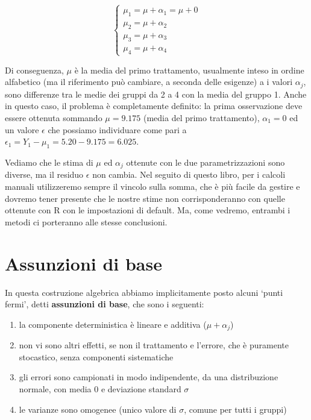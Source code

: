 \documentclass[a4paper,12pt,oneside]{book}
\providecommand{\tightlist}{%
  \setlength{\itemsep}{0pt}\setlength{\parskip}{0pt}}
\begin{document}
\[ \left\{ {\begin{array}{l}
\mu_1 = \mu + \alpha_1 = \mu + 0\\
\mu_2 = \mu + \alpha_2 \\
\mu_3 = \mu + \alpha_3 \\
\mu_4 = \mu + \alpha_4
\end{array}} \right.\]

Di conseguenza, \(\mu\) è la media del primo trattamento, usualmente inteso in ordine alfabetico (ma il riferimento può cambiare, a seconda delle esigenze) a i valori \(\alpha_j\), sono differenze tra le medie dei gruppi da 2 a 4 con la media del gruppo 1. Anche in questo caso, il problema è completamente definito: la prima osservazione deve essere ottenuta sommando \(\mu = 9.175\) (media del primo trattamento), \(\alpha_1 = 0\) ed un valore \(\epsilon\) che possiamo individuare come pari a \(\epsilon_1 = Y_1 - \mu_1 = 5.20 - 9.175 = 6.025\).

Vediamo che le stima di \(\mu\) ed \(\alpha_j\) ottenute con le due parametrizzazioni sono diverse, ma il residuo \(\epsilon\) non cambia. Nel seguito di questo libro, per i calcoli manuali utilizzeremo sempre il vincolo sulla somma, che è più facile da gestire e dovremo tener presente che le nostre stime non corrisponderanno con quelle ottenute con R con le impostazioni di default. Ma, come vedremo, entrambi i metodi ci porteranno alle stesse conclusioni.

\hypertarget{assunzioni-di-base}{%
\section{Assunzioni di base}\label{assunzioni-di-base}}

In questa costruzione algebrica abbiamo implicitamente posto alcuni `punti fermi', detti \textbf{assunzioni di base}, che sono i seguenti:

\begin{enumerate}
\def\labelenumi{\arabic{enumi}.}
\tightlist
\item
  la componente deterministica è lineare e additiva (\(\mu + \alpha_j\))
\item
  non vi sono altri effetti, se non il trattamento e l'errore, che è puramente stocastico, senza componenti sistematiche
\item
  gli errori sono campionati in modo indipendente, da una distribuzione normale, con media 0 e deviazione standard \(\sigma\)
\item
  le varianze sono omogenee (unico valore di \(\sigma\), comune per tutti i gruppi)
\end{enumerate}
\end{document}
